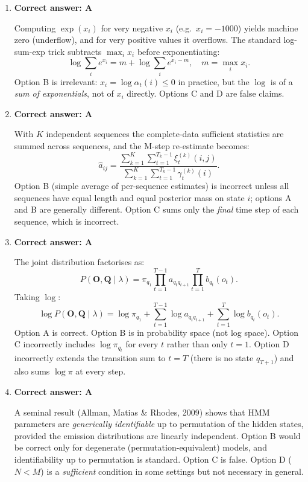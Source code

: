\documentclass[12pt]{article}
\begin{document}
\begin{enumerate}[label=\textbf{Q\arabic*.}, leftmargin=*, itemsep=1.5em]
\item \textbf{Correct answer: A}

Computing $\exp(x_i)$ for very negative $x_i$ (e.g.\ $x_i = -1000$) yields
machine zero (underflow), and for very positive values it overflows.
The standard log-sum-exp trick subtracts $\max_i x_i$ before exponentiating:
\[
    \log\!\sum_i e^{x_i}
    = m + \log\!\sum_i e^{x_i - m}, \quad m = \max_i x_i.
\]
Option B is irrelevant: $x_i = \log\alpha_t(i) \leq 0$ in practice, but the
$\log$ is of a \emph{sum of exponentials}, not of $x_i$ directly.
Options C and D are false claims.

\item \textbf{Correct answer: A}

With $K$ independent sequences the complete-data sufficient statistics are
summed across sequences, and the M-step re-estimate becomes:
\[
    \hat{a}_{ij}
    = \frac{\displaystyle\sum_{k=1}^{K}\sum_{t=1}^{T_k-1}\xi_t^{(k)}(i,j)}
           {\displaystyle\sum_{k=1}^{K}\sum_{t=1}^{T_k-1}\gamma_t^{(k)}(i)}.
\]
Option B (simple average of per-sequence estimates) is incorrect unless all
sequences have equal length and equal posterior mass on state $i$;
options A and B are generally different.
Option C sums only the \emph{final} time step of each sequence, which is incorrect.

\item \textbf{Correct answer: A}

The joint distribution factorises as:
\[
    P(\mathbf{O},\mathbf{Q}\mid\lambda)
    = \pi_{q_1}\prod_{t=1}^{T-1}a_{q_t q_{t+1}}\prod_{t=1}^{T}b_{q_t}(o_t).
\]
Taking $\log$:
\[
    \log P(\mathbf{O},\mathbf{Q}\mid\lambda)
    = \log\pi_{q_1}
      + \sum_{t=1}^{T-1}\log a_{q_t q_{t+1}}
      + \sum_{t=1}^{T}\log b_{q_t}(o_t).
\]
Option A is correct.
Option B is in probability space (not log space).
Option C incorrectly includes $\log\pi_{q_t}$ for every $t$ rather than only $t=1$.
Option D incorrectly extends the transition sum to $t=T$ (there is no state $q_{T+1}$) and also sums $\log\pi$ at every step.

\item \textbf{Correct answer: A}

A seminal result (Allman, Matias \& Rhodes, 2009) shows that HMM parameters are
\emph{generically identifiable} up to permutation of the hidden states,
provided the emission distributions are linearly independent.
Option B would be correct only for degenerate (permutation-equivalent) models,
and identifiability up to permutation is standard.
Option C is false.
Option D ($N < M$) is a \emph{sufficient} condition in some settings but not
necessary in general.


\end{enumerate}
\end{document}
